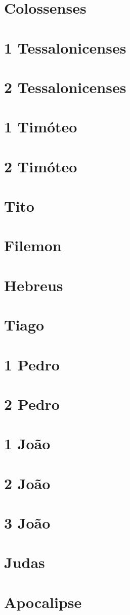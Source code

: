 \documentclass[a4paper,11pt,oneside]{book}
\theoremstyle{definition}
\theoremstyle{break}
\begin{document}
\chapter{Colossenses}
\chapter{1 Tessalonicenses}
\chapter{2 Tessalonicenses}
\chapter{1 Timóteo}
\chapter{2 Timóteo}
\chapter{Tito}
\chapter{Filemon}
\chapter{Hebreus}
\chapter{Tiago}
\chapter{1 Pedro}
\chapter{2 Pedro}
\chapter{1 João}
\chapter{2 João}
\chapter{3 João}
\chapter{Judas}
\chapter{Apocalipse}
\end{document}
